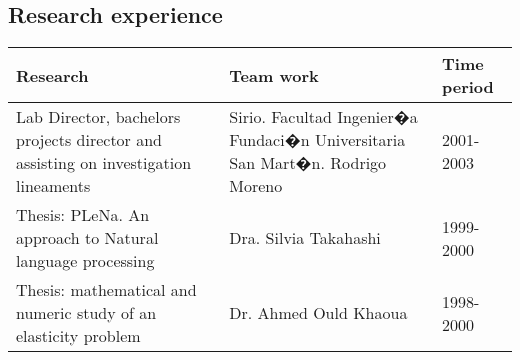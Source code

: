 \documentclass{article}
\begin{document}
\subsection{Research experience}
{\center
\begin{longtable}{p{8.5cm}p{4.5cm}p{2.5cm}}
\hline
\textbf{Research} & \textbf{Team work} & \textbf{Time period} \\
\hline
Lab Director, bachelors projects director and assisting on
investigation lineaments & Sirio. Facultad Ingenier�a
Fundaci�n Universitaria San Mart�n. Rodrigo Moreno & 2001-2003 \\
Thesis: PLeNa. An approach to Natural language processing & Dra. Silvia Takahashi & 1999-2000 \\
Thesis: mathematical and numeric study of an elasticity problem &
Dr. Ahmed Ould Khaoua & 1998-2000 \\
\hline
\end{longtable}}
\end{document}
